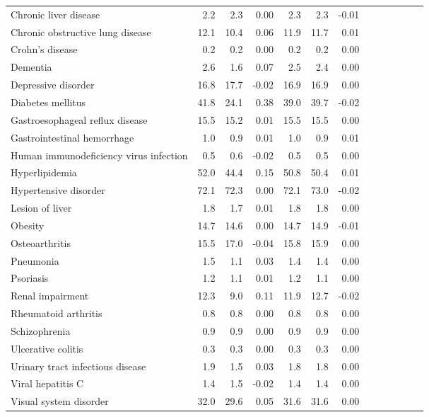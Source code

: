 \documentclass[11pt,]{article}
\begin{document}
\begin{longtable}{lrrrrrrrrrrrr}
      Chronic liver disease &  2.2 &  2.3 &  0.00 &  2.3 &  2.3 & -0.01 \\ 
      Chronic obstructive lung disease & 12.1 & 10.4 &  0.06 & 11.9 & 11.7 &  0.01 \\ 
      Crohn's disease &  0.2 &  0.2 &  0.00 &  0.2 &  0.2 &  0.00 \\ 
      Dementia &  2.6 &  1.6 &  0.07 &  2.5 &  2.4 &  0.00 \\ 
      Depressive disorder & 16.8 & 17.7 & -0.02 & 16.9 & 16.9 &  0.00 \\ 
      Diabetes mellitus & 41.8 & 24.1 &  0.38 & 39.0 & 39.7 & -0.02 \\ 
      Gastroesophageal reflux disease & 15.5 & 15.2 &  0.01 & 15.5 & 15.5 &  0.00 \\ 
      Gastrointestinal hemorrhage &  1.0 &  0.9 &  0.01 &  1.0 &  0.9 &  0.01 \\ 
      Human immunodeficiency virus infection &  0.5 &  0.6 & -0.02 &  0.5 &  0.5 &  0.00 \\ 
      Hyperlipidemia & 52.0 & 44.4 &  0.15 & 50.8 & 50.4 &  0.01 \\ 
      Hypertensive disorder & 72.1 & 72.3 &  0.00 & 72.1 & 73.0 & -0.02 \\ 
      Lesion of liver &  1.8 &  1.7 &  0.01 &  1.8 &  1.8 &  0.00 \\ 
      Obesity & 14.7 & 14.6 &  0.00 & 14.7 & 14.9 & -0.01 \\ 
      Osteoarthritis & 15.5 & 17.0 & -0.04 & 15.8 & 15.9 &  0.00 \\ 
      Pneumonia &  1.5 &  1.1 &  0.03 &  1.4 &  1.4 &  0.00 \\ 
      Psoriasis &  1.2 &  1.1 &  0.01 &  1.2 &  1.1 &  0.00 \\ 
      Renal impairment & 12.3 &  9.0 &  0.11 & 11.9 & 12.7 & -0.02 \\ 
      Rheumatoid arthritis &  0.8 &  0.8 &  0.00 &  0.8 &  0.8 &  0.00 \\ 
      Schizophrenia &  0.9 &  0.9 &  0.00 &  0.9 &  0.9 &  0.00 \\ 
      Ulcerative colitis &  0.3 &  0.3 &  0.00 &  0.3 &  0.3 &  0.00 \\ 
      Urinary tract infectious disease &  1.9 &  1.5 &  0.03 &  1.8 &  1.8 &  0.00 \\ 
      Viral hepatitis C &  1.4 &  1.5 & -0.02 &  1.4 &  1.4 &  0.00 \\ 
      Visual system disorder & 32.0 & 29.6 &  0.05 & 31.6 & 31.6 &  0.00 \\ 

\end{longtable}
\end{document}

